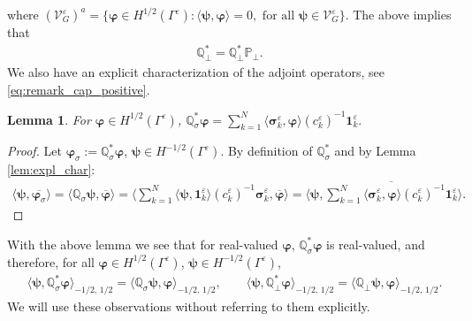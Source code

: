 \documentclass[]{article}
\newtheorem{lemma}{Lemma}
\newtheorem{proposition}{Proposition}
\numberwithin{equation}{section}
\numberwithin{theorem}{section}
\numberwithin{lemma}{section}
\numberwithin{corollary}{section}
\numberwithin{proposition}{section}
\numberwithin{definition}{section}
\newcommand{\re}{\varepsilon}
\renewcommand{\vec}{\boldsymbol}
\begin{document}
	where $( \mathcal{V}^{\re}_G )^a=\{\vec{\varphi}\in H^{1/2}(\Gamma^{\re}): \langle \vec{\psi}, \vec{\varphi}\rangle=0, \text{ for all }\vec{\psi}\in \mathcal{V}^{\re}_G\}$. The above implies that 
	\begin{align}
		\label{eq:qperp_adj}
		\mathbb{Q}_{\perp}^*=\mathbb{Q}_{\perp}^*\mathbb{P}_{\perp}.
	\end{align}
	We also have an explicit characterization of the adjoint operators, see \eqref{eq:remark_cap_positive}.  
	\begin{lemma}
		\label{lem:adjoint}
		For $\vec{\varphi} \in H^{1/2}(\Gamma^{\re})$, 
		$
		\mathbb{Q}_{\sigma}^*\vec{\varphi}=\sum\limits_{k=1}^N \langle \vec{\sigma}^{\re}_k, \vec{\varphi}\rangle (c_k^{\re})^{-1}\vec{1}^{\re}_k.
		$
	\end{lemma}
	\begin{proof}
		Let $\vec{\varphi}_{\sigma}:=	\mathbb{Q}_{\sigma}^*\vec{\varphi}$, $\vec{\psi}\in H^{-1/2}(\Gamma^{\re})$. By definition of $\mathbb{Q}_{\sigma}^*$ and by Lemma \ref{lem:expl_char}:
		\begin{align*}%
			\langle \vec{\psi},\overline{\vec{\varphi}_{\sigma}}\rangle =\langle \mathbb{Q}_{\sigma} \vec{\psi},\overline{\vec{\varphi}}\rangle = \langle \sum_{k=1}^N \langle \vec{\psi}, \vec{1}^{\re}_k \rangle (c^{\re}_k)^{-1} \vec{\sigma}^{\re}_k, \overline{\vec{\varphi}} \rangle = \langle \vec{\psi}, \overline{\sum_{k=1}^{N} \langle \vec{\sigma}^{\re}_k, \vec{\varphi}  \rangle (c^{\re}_k)^{-1} \vec{1}^{\re}_k} \rangle.
		\end{align*}	
	\end{proof}
	With the above lemma we see that for real-valued $\vec{\varphi}$, $\mathbb{Q}_{\sigma}^*\vec{\varphi}$ is real-valued, and therefore, for all $\vec{\varphi}\in H^{1/2}(\Gamma^{\re})$, $\vec{\psi}\in H^{-1/2}(\Gamma^{\re})$,
	\begin{align*}%
		&\langle \vec{\psi}, \mathbb{Q}^{*}_{\sigma} \vec{\varphi} \rangle_{-1/2, \, 1/2} = \langle \mathbb{Q}_{\sigma} \vec{\psi},  \vec{\varphi} \rangle_{-1/2, \, 1/2}, \qquad 
		\langle \vec{\psi}, \mathbb{Q}^{*}_{\perp} \vec{\varphi} \rangle_{-1/2, \, 1/2} = \langle \mathbb{Q}_{\perp} \vec{\psi},  \vec{\varphi} \rangle_{-1/2, \, 1/2}.	
	\end{align*}
	We will use these observations without referring to them explicitly. 
\end{document}

